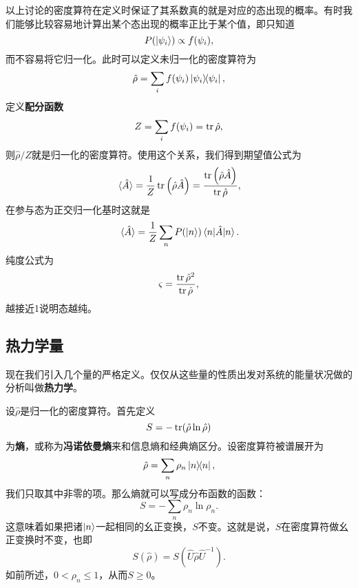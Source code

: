 \documentclass[hyperref, UTF8, a4paper]{ctexart}
\begin{document}
以上讨论的密度算符在定义时保证了其系数真的就是对应的态出现的概率。有时我们能够比较容易地计算出某个态出现的概率正比于某个值，即只知道
\begin{equation}
    P(\ket{\psi_i}) \propto f(\psi_i),
\end{equation}
而不容易将它归一化。此时可以定义未归一化的密度算符为
\begin{equation}
    \hat{\rho} = \sum_i f(\psi_i) \dyad{\psi_i},
\end{equation}
定义\textbf{配分函数}
\begin{equation}
    Z = \sum_i f(\psi_i) = \trace \hat{\rho},
\end{equation}
则$\hat{\rho} / Z$就是归一化的密度算符。使用这个关系，我们得到期望值公式为
\begin{equation}
    \expval*{\hat{A}} = \frac{1}{Z} \trace \left(\hat{\rho} \hat{A}\right) = \frac{\trace \left(\hat{\rho} \hat{A}\right)}{\trace \hat{\rho}},
\end{equation}
在参与态为正交归一化基时这就是
\begin{equation}
    \expval*{\hat{A}} = \frac{1}{Z} \sum_n P(\ket{n}) \mel{n}{\hat{A}}{n}.
\end{equation}
纯度公式为
\begin{equation}
    \varsigma = \frac{\trace \hat{\rho}^2}{\trace \hat{\rho}},
\end{equation}
越接近1说明态越纯。

\subsection{热力学量}

现在我们引入几个量的严格定义。仅仅从这些量的性质出发对系统的能量状况做的分析叫做\textbf{热力学}。

设$\hat{\rho}$是归一化的密度算符。首先定义
\begin{equation}
    S = - \trace (\hat{\rho} \ln \hat{\rho})
    \label{eq:neumann-entropy}
\end{equation}
为\textbf{熵}，或称为\textbf{冯诺依曼熵}来和信息熵和经典熵区分。设密度算符被谱展开为
\[
    \hat{\rho} = \sum_n \rho_n \dyad{n},
\]
我们只取其中非零的项。那么熵就可以写成分布函数的函数：
\begin{equation}
    S = - \sum_n \rho_n \ln \rho_n.
\end{equation}
这意味着如果把诸$\ket{n}$一起相同的幺正变换，$S$不变。这就是说，$S$在密度算符做幺正变换时不变，也即
\begin{equation}
    S(\hat{\rho}) = S(\hat{U} \hat{\rho} \hat{U}^{-1}).
\end{equation}
如前所述，$0 < \rho_n \leq 1$，从而$S \geq 0$。
\end{document}
